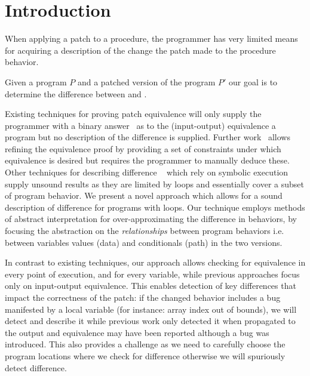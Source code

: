 \section{Introduction} 



When applying a patch to a procedure, the programmer has very limited means
for acquiring a description of the change the patch made to the procedure
behavior.

Given a program $P$ and a patched version of the program $P'$ our goal is to
determine the difference between  and .

Existing techniques for proving patch equivalence will only supply the
programmer with a binary answer~\cite{GodlinStrichman09} as to the
(input-output) equivalence a program but no description of the difference is
supplied. Further work~\cite{KawaguchiLahiriRebelo10} allows refining the
equivalence proof by providing a set of constraints under which equivalence
is desired but requires the programmer to manually deduce these. Other
techniques for describing difference
~\cite{DwyerElbaumPerson08,HawblitzelKawaguchiLahiriRebelo12} which rely on
symbolic execution supply unsound results as they are limited by loops and
essentially cover a subset of program behavior. We present a novel approach
which allows for a sound description of difference for programs with loops.
Our technique employs methods of abstract interpretation for
over-approximating the difference in behaviors, by focusing the abstraction
on the \emph{relationships} between program behaviors i.e. between variables
values (data) and conditionals (path) in the two versions.

In contrast to existing techniques, our approach allows checking for
equivalence in every point of execution, and for every variable, while
previous approaches focus only on input-output equivalence. This enables
detection of key differences that impact the correctness of the patch: if the
changed behavior includes a bug manifested by a local variable (for instance:
array index out of bounds), we will detect and describe it while previous
work only detected it when propagated to the output and equivalence may have
been reported although a bug was introduced. This also provides a challenge
as we need to carefully choose the program locations where we check for
difference otherwise we will spuriously detect difference.

